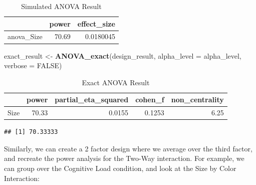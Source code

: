 \documentclass[]{book}
\newenvironment{Shaded}{\begin{snugshade}}{\end{snugshade}}
\newcommand{\CommentTok}[1]{\textcolor[rgb]{0.56,0.35,0.01}{\textit{#1}}}
\newcommand{\DataTypeTok}[1]{\textcolor[rgb]{0.13,0.29,0.53}{#1}}
\newcommand{\KeywordTok}[1]{\textcolor[rgb]{0.13,0.29,0.53}{\textbf{#1}}}
\newcommand{\NormalTok}[1]{#1}
\newcommand{\OperatorTok}[1]{\textcolor[rgb]{0.81,0.36,0.00}{\textbf{#1}}}
\newcommand{\OtherTok}[1]{\textcolor[rgb]{0.56,0.35,0.01}{#1}}
\newcommand{\StringTok}[1]{\textcolor[rgb]{0.31,0.60,0.02}{#1}}
\begin{document}
\begin{table}[t]

\caption{\label{tab:unnamed-chunk-178}Simulated ANOVA Result}
\centering
\begin{tabular}{l|r|r}
\hline
  & power & effect\_size\\
\hline
anova\_Size & 70.69 & 0.0180045\\
\hline
\end{tabular}
\end{table}

\begin{Shaded}
\begin{Highlighting}[]
\NormalTok{exact_result <-}\StringTok{ }\KeywordTok{ANOVA_exact}\NormalTok{(design_result,}
                            \DataTypeTok{alpha_level =}\NormalTok{ alpha_level,}
                            \DataTypeTok{verbose =} \OtherTok{FALSE}\NormalTok{)}
\end{Highlighting}
\end{Shaded}

\begin{table}[t]

\caption{\label{tab:unnamed-chunk-180}Exact ANOVA Result}
\centering
\begin{tabular}{l|r|r|r|r}
\hline
  & power & partial\_eta\_squared & cohen\_f & non\_centrality\\
\hline
Size & 70.33 & 0.0155 & 0.1253 & 6.25\\
\hline
\end{tabular}
\end{table}

\begin{Shaded}
\end{Shaded}

\begin{verbatim}
## [1] 70.33333
\end{verbatim}

Similarly, we can create a 2 factor design where we average over the third factor, and recreate the power analysis for the Two-Way interaction. For example, we can group over the Cognitive Load condition, and look at the Size by Color Interaction:
\end{document}
